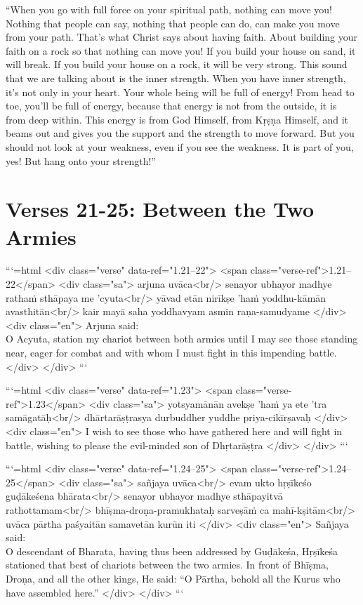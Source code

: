 \enquote{When you go with full force on your spiritual path, nothing can move you! Nothing that people can say, nothing that people can do, can make you move from your path. That’s what Christ says about having faith. About building your faith on a rock so that nothing can move you! If you build your house on sand, it will break. If you build your house on a rock, it will be very strong. This sound that we are talking about is the inner strength. When you have inner strength, it’s not only in your heart. Your whole being will be full of energy! From head to toe, you’ll be full of energy, because that energy is not from the outside, it is from deep within. This energy is from God Himself, from Kṛṣṇa Himself, and it beams out and gives you the support and the strength to move forward. But you should not look at your weakness, even if you see the weakness. It is part of you, yes! But hang onto your strength!}

\newpage
\section{Verses 21-25: Between the Two Armies}\label{sec-verses-21-25-between-the-two-armies}


```{=html}
<div class="verse" data-ref="1.21–22">
  <span class="verse-ref">1.21–22</span>
  <div class="sa">
    arjuna uvāca<br/>
    senayor ubhayor madhye rathaṁ sthāpaya me ’cyuta<br/>
    yāvad etān nirīkṣe ’haṁ yoddhu-kāmān avasthitān<br/>
    kair mayā saha yoddhavyam asmin raṇa-samudyame
  </div>
  <div class="en">
    \hspace*{1em}Arjuna said: \\ O Acyuta, station my chariot between both armies until I may see those standing near, eager for combat and with whom I must fight in this impending battle.
  </div>
</div>
```



```{=html}
<div class="verse" data-ref="1.23">
  <span class="verse-ref">1.23</span>
  <div class="sa">
    yotsyamānān avekṣe ’haṁ ya ete ’tra samāgatāḥ<br/>
    dhārtarāṣṭrasya durbuddher yuddhe priya-cikīrṣavaḥ
  </div>
  <div class="en">
    I wish to see those who have gathered here and will fight in battle, wishing to please the evil-minded son of Dhṛtarāṣṭra
  </div>
</div>
```



```{=html}
<div class="verse" data-ref="1.24–25">
  <span class="verse-ref">1.24–25</span>
  <div class="sa">
    sañjaya uvāca<br/>
    evam ukto hṛṣīkeśo guḍākeśena bhārata<br/>
    senayor ubhayor madhye sthāpayitvā rathottamam<br/>
    bhīṣma-droṇa-pramukhataḥ sarveṣāṁ ca mahī-kṣitām<br/>
    uvāca pārtha paśyaitān samavetān kurūn iti
  </div>
  <div class="en">
    \hspace*{1em}Sañjaya said: \\ O descendant of Bharata, having thus been addressed by Guḍākeśa, Hṛṣīkeśa stationed that best of chariots between the two armies. In front of Bhīṣma, Droṇa, and all the other kings, He said: \enquote{O Pārtha, behold all the Kurus who have assembled here.}
  </div>
</div>
```


